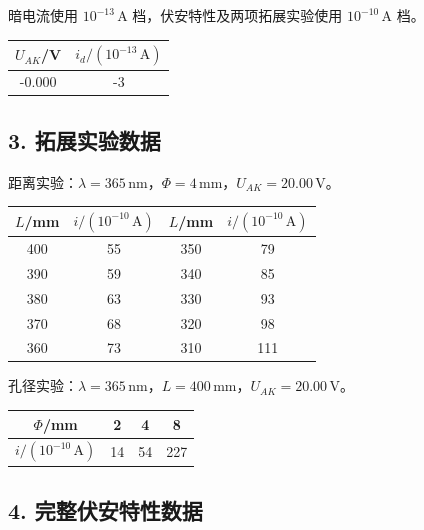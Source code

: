暗电流使用 $10^{-13}\,\mathrm A$ 档，伏安特性及两项拓展实验使用 $10^{-10}\,\mathrm A$ 档。

\begin{center}\small{}
\renewcommand{\arraystretch}{1.25}
\begin{tabular}{|c|c|}
\hline
$U_{AK}$/V & $i_d/(10^{-13}\,\mathrm A)$\\\hline
-0.000 & -3\\\hline
\end{tabular}
\end{center}



\subsection*{3. 拓展实验数据}

距离实验：$\lambda=365\,\mathrm{nm}$，$\Phi=4\,\mathrm{mm}$，$U_{AK}=20.00\,\mathrm V$。

\begin{center}\small{}
\renewcommand{\arraystretch}{1.25}
\begin{tabular}{|c|c|c|c|}
\hline
$L$/mm & $i/(10^{-10}\,\mathrm A)$ & $L$/mm & $i/(10^{-10}\,\mathrm A)$\\\hline
400 & 55 & 350 & 79\\\hline
390 & 59 & 340 & 85\\\hline
380 & 63 & 330 & 93\\\hline
370 & 68 & 320 & 98\\\hline
360 & 73 & 310 & 111\\\hline
\end{tabular}
\end{center}

孔径实验：$\lambda=365\,\mathrm{nm}$，$L=400\,\mathrm{mm}$，$U_{AK}=20.00\,\mathrm V$。

\begin{center}\small{}
\renewcommand{\arraystretch}{1.25}
\begin{tabular}{|c|c|c|c|}
\hline
$\Phi$/mm & 2 & 4 & 8\\\hline
$i/(10^{-10}\,\mathrm A)$ & 14 & 54 & 227\\\hline
\end{tabular}
\end{center}


\newpage
\subsection*{4. 完整伏安特性数据}


